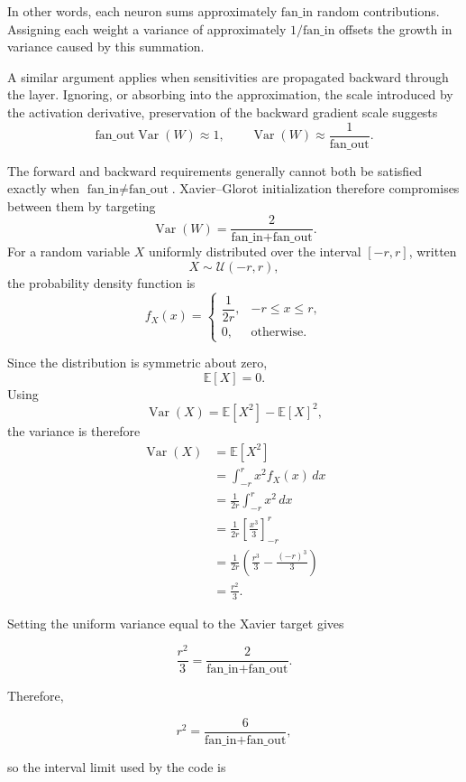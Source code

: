 \documentclass{article}
\begin{document}
In other words, each neuron sums approximately
\(\text{fan\_in}\) random contributions. Assigning each weight a
variance of approximately \(1/\text{fan\_in}\) offsets the growth in
variance caused by this summation.

A similar argument applies when sensitivities are propagated backward
through the layer. Ignoring, or absorbing into the approximation, the
scale introduced by the activation derivative, preservation of the
backward gradient scale suggests
\[
  \text{fan\_out}\operatorname{Var}(W) \approx 1,
  \qquad
  \operatorname{Var}(W)
  \approx
  \frac{1}{\text{fan\_out}}.
\]

The forward and backward requirements generally cannot both be
satisfied exactly when
\(\text{fan\_in}\neq\text{fan\_out}\). Xavier--Glorot initialization
therefore compromises between them by targeting
\[
  \operatorname{Var}(W)
  =
  \frac{2}{
    \text{fan\_in}+\text{fan\_out}
  }.
\]
For a random variable \(X\) uniformly distributed over the interval
\([-r,r]\), written
\[
X \sim \mathcal{U}(-r,r),
\]
the probability density function is
\[
f_X(x)
=
\begin{cases}
\dfrac{1}{2r}, & -r \leq x \leq r,\\[4pt]
0, & \text{otherwise}.
\end{cases}
\]

Since the distribution is symmetric about zero,
\[
\mathbb{E}[X]=0.
\]
Using
\[
\operatorname{Var}(X)
=
\mathbb{E}[X^2]-\mathbb{E}[X]^2,
\]
the variance is therefore
\[
\begin{aligned}
\operatorname{Var}(X)
&=
\mathbb{E}[X^2] \\
&=
\int_{-r}^{r} x^2 f_X(x)\,dx \\
&=
\frac{1}{2r}\int_{-r}^{r}x^2\,dx \\
&=
\frac{1}{2r}
\left[\frac{x^3}{3}\right]_{-r}^{r} \\
&=
\frac{1}{2r}
\left(
\frac{r^3}{3}
-
\frac{(-r)^3}{3}
\right) \\
&=
\frac{r^2}{3}.
\end{aligned}
\]

Setting the uniform variance equal to the Xavier target gives

\[
  \frac{r^2}{3}
  =
  \frac{2}{\text{fan\_in} + \text{fan\_out}}.
\]

Therefore,

\[
  r^2
  =
  \frac{6}{\text{fan\_in} + \text{fan\_out}},
\]

so the interval limit used by the code is
\end{document}
